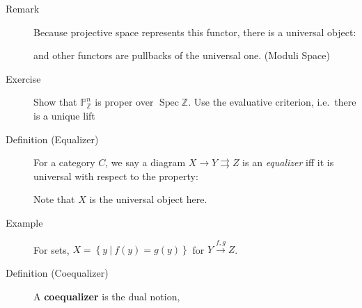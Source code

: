 \begin{description}
\item[Remark]
Because projective space represents this functor, there is a universal
object:

\begin{center}
\end{center}

and other functors are pullbacks of the universal one. (Moduli Space)
\item[Exercise]
Show that \({\mathbb{P}}_{\mathbb{Z}}^n\) is proper over
\(\operatorname{Spec}{\mathbb{Z}}\). Use the evaluative criterion,
i.e.~there is a unique lift

\begin{center}
\end{center}
\item[Definition (Equalizer)]
For a category \(C\), we say a diagram \(X \to Y \rightrightarrows Z\)
is an \emph{equalizer} iff it is universal with respect to the property:

\begin{center}
\end{center}

Note that \(X\) is the universal object here.
\item[Example]
For sets, \(X = \left\{{y {~\mathrel{\Big|}~}f(y) = g(y)}\right\}\) for
\(Y \xrightarrow{f, g} Z\).
\item[Definition (Coequalizer)]
A \textbf{coequalizer} is the dual notion,


\end{description}
